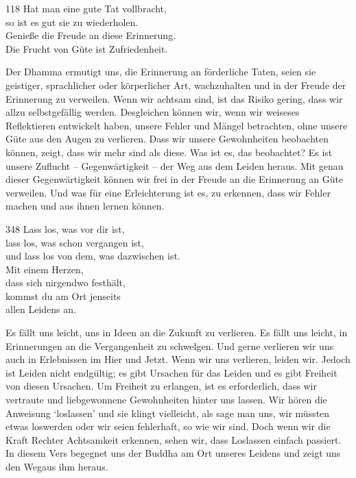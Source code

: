 
\begin{dhpVerse}{118}
\label{dhp-118}
Hat man eine gute Tat vollbracht,\\ 
so ist es gut sie zu wiederholen.\\ 
Genieße die Freude an diese Erinnerung.\\ 
Die Frucht von Güte ist Zufriedenheit. 
\end{dhpVerse}

\begin{dhpRefl}

Der Dhamma ermutigt uns, die Erinnerung an förderliche Taten, seien sie
geistiger, sprachlicher oder körperlicher Art, wachzuhalten und in der Freude
der Erinnerung zu verweilen. Wenn wir achtsam sind, ist das Risiko gering,
dass wir allzu selbstgefällig werden. Desgleichen können wir, wenn wir
weiseses Reflektieren entwickelt haben, unsere Fehler und Mängel betrachten,
ohne unsere Güte aus den Augen zu verlieren. Dass wir unsere Gewohnheiten
beobachten können, zeigt, dass wir mehr sind als diese. Was ist es, das
beobachtet? Es ist unsere Zuflucht -- Gegenwärtigkeit -- der Weg aus dem
Leiden heraus. Mit genau dieser Gegenwärtigkeit können wir frei in der Freude
an die Erinnerung an Güte verweilen. Und was für eine Erleichterung ist es, zu
erkennen, dass wir Fehler machen und aus ihnen lernen können.

\end{dhpRefl}


\begin{dhpVerse}{348}
\label{dhp-348}
Lass los, was vor dir ist,\\ 
lass los, was schon vergangen ist,\\ 
und lass los von dem, was dazwischen ist.\\ 
Mit einem Herzen,\\ 
dass sich nirgendwo festhält,\\ 
kommst du am Ort jenseits\\ 
allen Leidens an. 
\end{dhpVerse}

\begin{dhpRefl}

Es fällt uns leicht, uns in Ideen an die Zukunft zu verlieren. Es fällt uns
leicht, in Erinnerungen an die Vergangenheit zu schwelgen. Und gerne verlieren
wir uns auch in Erlebnissen im Hier und Jetzt. Wenn wir uns verlieren, leiden
wir. Jedoch ist Leiden nicht endgültig; es gibt Ursachen für das Leiden und es
gibt Freiheit von diesen Ursachen. Um Freiheit zu erlangen, ist es
erforderlich, dass wir vertraute und liebgewonnene Gewohnheiten hinter uns
lassen. Wir hören die Anweisung `loslassen' und sie klingt vielleicht, als
sage man uns, wir müssten etwas loswerden oder wir seien fehlerhaft, so wie
wir sind. Doch wenn wir die Kraft Rechter Achtsamkeit erkennen, sehen wir,
dass Loslassen einfach passiert. In diesem Vers begegnet uns der Buddha am Ort
unseres Leidens und zeigt uns den Wegaus ihm heraus.

\end{dhpRefl}

